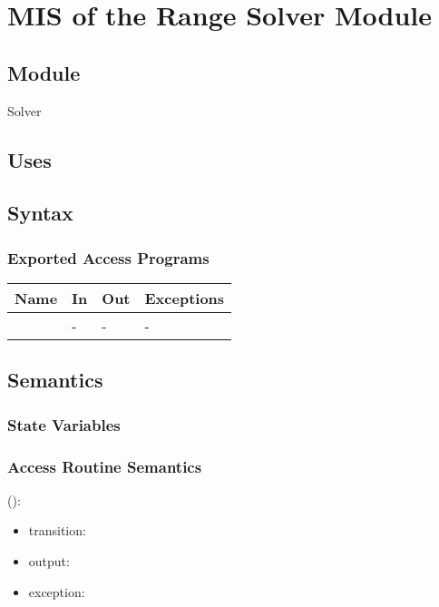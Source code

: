 \documentclass[12pt, titlepage]{article}
\begin{document}
\newpage

\section{MIS of the Range Solver Module} 
\label{Module_rangesolver}

\subsection{Module}

Solver

\subsection{Uses}


\subsection{Syntax}

\subsubsection{Exported Access Programs}

\begin{center}
	\begin{tabular}{p{3cm} p{4cm} p{4cm} p{2cm}}
		\hline
		\textbf{Name} & \textbf{In} & \textbf{Out} & \textbf{Exceptions} \\
		\hline
		\wss{accessProg} & - & - & - \\
		\hline
	\end{tabular}
\end{center}

\subsection{Semantics}

\subsubsection{State Variables}


\subsubsection{Access Routine Semantics}

\noindent {}():
\begin{itemize}
	\item transition:  
	\item output:  
	\item exception:  
\end{itemize}
\end{document}
